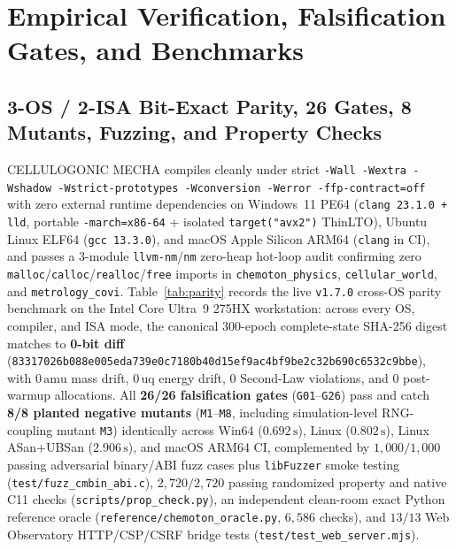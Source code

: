\documentclass[11pt,reqno]{amsart}
\theoremstyle{plain}
\theoremstyle{definition}
\theoremstyle{remark}
\newcommand{\code}[1]{{\footnotesize\nolinkurl{#1}}}
\begin{document}
\section{Empirical Verification, Falsification Gates, and Benchmarks}
\label{sec:results}

\subsection{3-OS / 2-ISA Bit-Exact Parity, 26 Gates, 8 Mutants, Fuzzing, and Property Checks}
CELLULOGONIC MECHA compiles cleanly under strict \texttt{-Wall -Wextra -Wshadow -Wstrict-prototypes -Wconversion -Werror -ffp-contract=off} with zero external runtime dependencies on Windows~11 PE64 (\texttt{clang 23.1.0 + lld}, portable \code{-march=x86-64} + isolated \code{target("avx2")} ThinLTO), Ubuntu Linux ELF64 (\texttt{gcc 13.3.0}), and macOS Apple Silicon ARM64 (\texttt{clang} in CI), and passes a 3-module \code{llvm-nm}/\code{nm} zero-heap hot-loop audit confirming zero \code{malloc}/\code{calloc}/\code{realloc}/\code{free} imports in \code{chemoton_physics}, \code{cellular_world}, and \code{metrology_covi}. Table~\ref{tab:parity} records the live \texttt{v1.7.0} cross-OS parity benchmark on the Intel Core Ultra~9 275HX workstation: across every OS, compiler, and ISA mode, the canonical 300-epoch complete-state SHA-256 digest matches to \textbf{0-bit diff} (\code{83317026b088e005eda739e0c7180b40d15ef9ac4bf9be2c32b690c6532c9bbe}), with $0\,\mathrm{amu}$ mass drift, $0\,\mathrm{uq}$ energy drift, $0$ Second-Law violations, and $0$ post-warmup allocations. All \textbf{26/26 falsification gates} (\code{G01}--\code{G26}) pass and catch \textbf{8/8 planted negative mutants} (\code{M1}--\code{M8}, including simulation-level RNG-coupling mutant \code{M3}) identically across Win64 ($0.692\,\mathrm{s}$), Linux ($0.802\,\mathrm{s}$), Linux ASan+UBSan ($2.906\,\mathrm{s}$), and macOS ARM64 CI, complemented by $1{,}000/1{,}000$ passing adversarial binary/ABI fuzz cases plus \code{libFuzzer} smoke testing (\code{test/fuzz_cmbin_abi.c}), $2{,}720/2{,}720$ passing randomized property and native C11 checks (\code{scripts/prop_check.py}), an independent clean-room exact Python reference oracle (\code{reference/chemoton_oracle.py}, $6{,}586$ checks), and $13/13$ Web Observatory HTTP/CSP/CSRF bridge tests (\code{test/test_web_server.mjs}).
\end{document}

